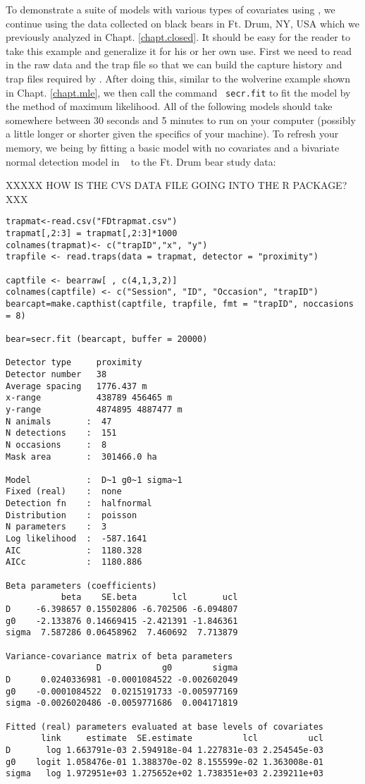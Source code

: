 To demonstrate
a suite of models with various types of covariates using \secr, we
continue using the data collected on black bears in Ft. Drum, NY, USA
which we previously analyzed in Chapt. \ref{chapt.closed}.
It should be easy for the reader to take this example and generalize
it for his or her own use.  First we need to read in the raw data and
the trap file so that we can build the capture history and trap files
required by \secr.  After doing this, similar to the wolverine example
shown in Chapt. \ref{chapt.mle}, we then call the command \mbox{\tt
  secr.fit}
to fit the model by the method of maximum likelihood.
 All of the following models should take somewhere between 30
seconds and 5 minutes to run on your computer (possibly a little
longer or shorter given the specifics of your machine).  To refresh
your memory, we being by fitting a basic
model with no covariates and a bivariate normal detection model in
\secr~ to the Ft. Drum bear study data:

XXXXX HOW IS THE CVS DATA FILE GOING INTO THE R PACKAGE? XXX
{\small
\begin{verbatim}
trapmat<-read.csv("FDtrapmat.csv")
trapmat[,2:3] = trapmat[,2:3]*1000
colnames(trapmat)<- c("trapID","x", "y")
trapfile <- read.traps(data = trapmat, detector = "proximity")

captfile <- bearraw[ , c(4,1,3,2)]
colnames(captfile) <- c("Session", "ID", "Occasion", "trapID")
bearcapt=make.capthist(captfile, trapfile, fmt = "trapID", noccasions = 8)

bear=secr.fit (bearcapt, buffer = 20000)

Detector type     proximity
Detector number   38
Average spacing   1776.437 m
x-range           438789 456465 m
y-range           4874895 4887477 m
N animals       :  47
N detections    :  151
N occasions     :  8
Mask area       :  301466.0 ha

Model           :  D~1 g0~1 sigma~1
Fixed (real)    :  none
Detection fn    :  halfnormal
Distribution    :  poisson
N parameters    :  3
Log likelihood  :  -587.1641
AIC             :  1180.328
AICc            :  1180.886

Beta parameters (coefficients)
           beta    SE.beta       lcl       ucl
D     -6.398657 0.15502806 -6.702506 -6.094807
g0    -2.133876 0.14669415 -2.421391 -1.846361
sigma  7.587286 0.06458962  7.460692  7.713879

Variance-covariance matrix of beta parameters
                  D            g0        sigma
D      0.0240336981 -0.0001084522 -0.002602049
g0    -0.0001084522  0.0215191733 -0.005977169
sigma -0.0026020486 -0.0059771686  0.004171819

Fitted (real) parameters evaluated at base levels of covariates
       link     estimate  SE.estimate          lcl          ucl
D       log 1.663791e-03 2.594918e-04 1.227831e-03 2.254545e-03
g0    logit 1.058476e-01 1.388370e-02 8.155599e-02 1.363008e-01
sigma   log 1.972951e+03 1.275652e+02 1.738351e+03 2.239211e+03
\end{verbatim}
}


